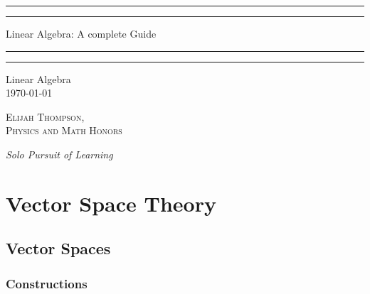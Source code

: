 \documentclass[12pt]{report}
\begin{document}

\begin{titlepage}
    \centering
    \scshape
    \vspace*{\baselineskip}
    \rule{\textwidth}{1.6pt}\vspace*{-\baselineskip}\vspace*{2pt}
    \rule{\textwidth}{0.4pt}
    
    \vspace{0.75\baselineskip}
    
    {\LARGE Linear Algebra: A complete Guide}
    
    \vspace{0.75\baselineskip}
    
    \rule{\textwidth}{0.4pt}\vspace*{-\baselineskip}\vspace{3.2pt}
    \rule{\textwidth}{1.6pt}
    
    \vspace{2\baselineskip}
    Linear Algebra \\
    \vspace*{3\baselineskip}
    \monthdayyeardate\today \\
    \vspace*{5.0\baselineskip}
    
    {\scshape\Large Elijah Thompson, \\ Physics and Math Honors\\}
    
    \vspace{1.0\baselineskip}
    \textit{Solo Pursuit of Learning}
\end{titlepage}

\tableofcontents

\part{Vector Space Theory}

\chapter{Vector Spaces}


\begin{subappendices}
    \section{Constructions}
\end{subappendices}
\end{document}

